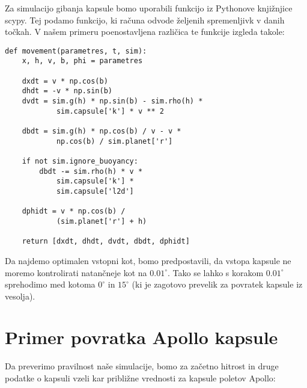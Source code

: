 \documentclass[11pt,a4paper]{article}
\begin{document}
Za simulacijo gibanja kapsule bomo uporabili funkcijo  iz Pythonove knji\v znjice scypy. Tej podamo funkcijo, ki ra\v cuna odvode \v zeljenih spremenljivk v danih to\v ckah. V na\v sem primeru poenostavljena razli\v cica te funkcije izgleda takole: \\
\begin{lstlisting}
def movement(parametres, t, sim):
	x, h, v, b, phi = parametres

	dxdt = v * np.cos(b)
	dhdt = -v * np.sin(b)
	dvdt = sim.g(h) * np.sin(b) - sim.rho(h) *
			sim.capsule['k'] * v ** 2
			
	dbdt = sim.g(h) * np.cos(b) / v - v *
			np.cos(b) / sim.planet['r']
			
	if not sim.ignore_buoyancy:
		dbdt -= sim.rho(h) * v *
			sim.capsule['k'] *
			sim.capsule['l2d']
			
	dphidt = v * np.cos(b) /
			(sim.planet['r'] + h)

	return [dxdt, dhdt, dvdt, dbdt, dphidt]
\end{lstlisting}
\clearpage

Da najdemo optimalen vstopni kot, bomo predpostavili, da vstopa kapsule ne moremo kontrolirati natan\v cneje kot na $0.01^\circ $. Tako se lahko s korakom $0.01^\circ $ sprehodimo med kotoma $0^\circ$ in $15^\circ$ (ki je zagotovo prevelik za povratek kapsule iz vesolja). \\

\section{Primer povratka Apollo kapsule}
Da preverimo pravilnost na\v se simulacije, bomo za za\v cetno hitrost in druge podatke o kapsuli vzeli kar pribli\v zne vrednosti za kapsule poletov Apollo:
\end{document}
